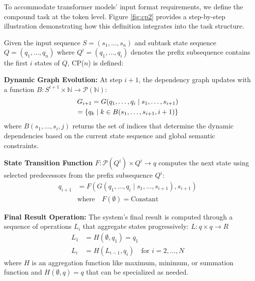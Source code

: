 To accommodate transformer models' input format requirements, we define the compound task at the token level. Figure \ref{fig:cp2} provides a step-by-step illustration demonstrating how this definition integrates into the task structure.
\begin{definition}
\label{def:CP}
Given the input sequence $S = (s_1, \ldots, s_n)$ and subtask state sequence $Q = (q_1, \ldots, q_n)$ where $Q^i = (q_1, \ldots, q_i)$ denotes the prefix subsequence contains the first $i$ states of $Q$, CP($n$) is defined:
\setlength{\itemsep}{-1pt}
\item \textbf{Dynamic Graph Evolution:} At step $i+1$, the dependency graph updates with a function $B: S^{i+1} \times \mathbb{N} \to \mathcal{P}(\mathbb{N})$:
\begin{align}
    G_{i + 1} = G(q_1, \ldots, q_i \mid s_1, \ldots, s_{i+1})
    \notag\\= \{q_k \mid k \in B(s_1,\ldots,s_{i+1}, i+1)\}
\end{align}
\vspace{-0.1em}
where $B(s_1,\ldots,s_i, j)$ returns the set of indices that determine the dynamic dependencies based on the current state sequence and global semantic constraints.
\vspace{-0.4em}
\item \textbf{State Transition Function} $F: \mathcal{P}(Q^i) \times Q^i \to q$ computes the next state using selected predecessors from the prefix subsequence $Q^i$:
\begin{equation*}
    \begin{split}
        q_{i+1} &= F(G(q_1, \ldots, q_i \mid s_1, \ldots, s_{i+1}), s_{i+1}) \\
        &\text{where} \quad F(\emptyset) = \text{Constant}
    \end{split}
\end{equation*}
\vspace{-1em}
\item \textbf{Final Result Operation:} The system's final result is computed through a sequence of operations $L_i$ that aggregate states progressively: $L: q \times q \rightarrow R$
\begin{equation*}
\begin{split}
    L_1 &= H(\emptyset, q_1) = q_1 \\
    L_i &= H(L_{i-1}, q_i) \quad \text{for } i = 2,\ldots,N
\end{split}
\end{equation*}
\vspace{-0.2em}
where $H$ is an aggregation function like maximum, minimum, or summation function and $H(\emptyset, q) = q$ that can be specialized as needed.


\end{definition}
\vspace{-\baselineskip}
